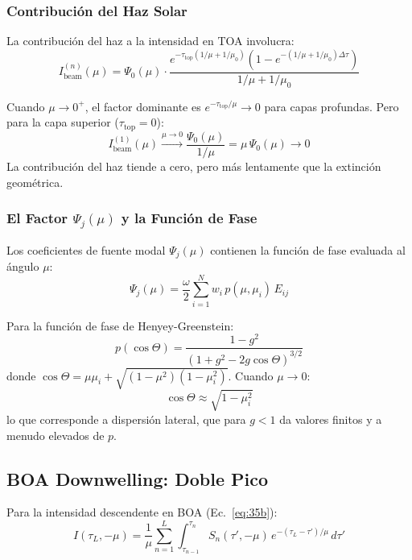 \documentclass[a4paper,11pt]{article}
\begin{document}
\subsubsection{Contribuci\'on del Haz Solar}

La contribuci\'on del haz a la intensidad en TOA involucra:
\begin{equation}
I_{\text{beam}}^{(n)}(\mu) = \Psi_0(\mu) \cdot \frac{e^{-\tau_{\text{top}} (1/\mu + 1/\mu_0)} \left(1 - e^{-(1/\mu + 1/\mu_0)\Delta\tau}\right)}{1/\mu + 1/\mu_0}
\end{equation}

Cuando $\mu \to 0^+$, el factor dominante es $e^{-\tau_{\text{top}}/\mu} \to 0$ para capas profundas. Pero para la capa superior ($\tau_{\text{top}} = 0$):
\begin{equation}
I_{\text{beam}}^{(1)}(\mu) \xrightarrow{\mu \to 0} \frac{\Psi_0(\mu)}{1/\mu} = \mu \, \Psi_0(\mu) \to 0
\end{equation}
La contribuci\'on del haz tiende a cero, pero m\'as lentamente que la extinci\'on geom\'etrica.

\subsubsection{El Factor $\Psi_j(\mu)$ y la Funci\'on de Fase}

Los coeficientes de fuente modal $\Psi_j(\mu)$ contienen la funci\'on de fase evaluada al \'angulo $\mu$:
\begin{equation}
\Psi_j(\mu) = \frac{\omega}{2} \sum_{i=1}^{N} w_i \, p(\mu, \mu_i) \, E_{ij}
\end{equation}

Para la funci\'on de fase de Henyey-Greenstein:
\begin{equation}
p(\cos\Theta) = \frac{1 - g^2}{(1 + g^2 - 2g\cos\Theta)^{3/2}}
\end{equation}
donde $\cos\Theta = \mu \mu_i + \sqrt{(1-\mu^2)(1-\mu_i^2)}$.  Cuando $\mu \to 0$:
\begin{equation}
\cos\Theta \approx \sqrt{1 - \mu_i^2}
\end{equation}
lo que corresponde a dispersi\'on lateral, que para $g < 1$ da valores finitos y a menudo elevados de $p$.

\subsection{BOA Downwelling: Doble Pico}

Para la intensidad descendente en BOA (Ec.~\eqref{eq:35b}):
\begin{equation}
I(\tau_L, -\mu) = \frac{1}{\mu} \sum_{n=1}^{L} \int_{\tau_{n-1}}^{\tau_n} S_n(\tau', -\mu) \, e^{-(\tau_L - \tau')/\mu} \, d\tau'
\end{equation}
\end{document}
